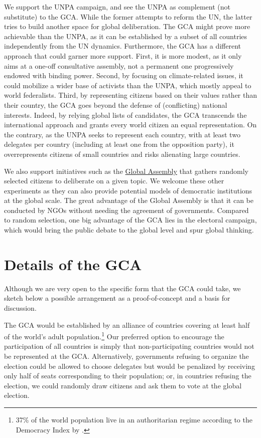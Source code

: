 \documentclass[12pt,english]{article}
\begin{document}
We support the UNPA campaign, and see the UNPA as complement (not substitute) to the GCA. While the former attempts to reform the UN, the latter tries to build another space for global deliberation. The GCA might prove more achievable than the UNPA, as it can be established by a subset of all countries independently from the UN dynamics. Furthermore, the GCA has a different approach that could garner more support. First, it is more modest, as it only aims at a one-off consultative assembly, not a permanent one progressively endowed with binding power. Second, by focusing on climate-related issues, it could mobilize a wider base of activists than the UNPA, which mostly appeal to world federalists.  Third, by representing citizens based on their values rather than their country, the GCA goes beyond the defense of (conflicting) national interests. Indeed, by relying global lists of candidates, the GCA transcends the international approach and grants every world citizen an equal representation. On the contrary, as the UNPA seeks to represent each country, with at least two delegates per country (including at least one from the opposition party), it overrepresents citizens of small countries and risks alienating large countries. 

We also support initiatives such as the \href{https://globalassembly.org/}{Global Assembly} that gathers randomly selected citizens to deliberate on a given topic. We welcome these other experiments as they can also provide potential models of democratic institutions at the global scale. The great advantage of the Global Assembly is that it can be conducted by NGOs without needing the agreement of governments. Compared to random selection, one big advantage of the GCA lies in the electoral campaign, which would bring the public debate to the global level and spur global thinking.%


\section{Details of the GCA}\label{sec:details}

Although we are very open to the specific form that the GCA could take, we sketch below a possible arrangement as a proof-of-concept and a basis for discussion. 

The GCA would be established by an alliance of countries covering at least half of the world's adult population.\footnote{37\% of the world population live in an authoritarian regime according to the Democracy Index by \citet{eiu_democracy_2022}.} 
Our preferred option to encourage the participation of all countries is simply that non-participating countries would not be represented at the GCA. Alternatively,  governments refusing to organize the election could be allowed to choose delegates but would be penalized by receiving only half of seats corresponding to their population; or, in countries refusing the election, we could randomly draw citizens and ask them to vote at the global election. 
\end{document}
